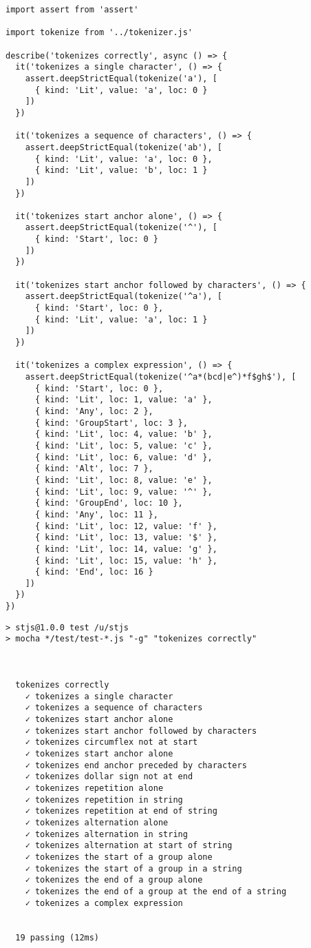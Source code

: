 \documentclass[krantzl]{krantz}
\begin{document}
\begin{lstlisting}[frame=tblr]
import assert from 'assert'

import tokenize from '../tokenizer.js'

describe('tokenizes correctly', async () => {
  it('tokenizes a single character', () => {
    assert.deepStrictEqual(tokenize('a'), [
      { kind: 'Lit', value: 'a', loc: 0 }
    ])
  })

  it('tokenizes a sequence of characters', () => {
    assert.deepStrictEqual(tokenize('ab'), [
      { kind: 'Lit', value: 'a', loc: 0 },
      { kind: 'Lit', value: 'b', loc: 1 }
    ])
  })

  it('tokenizes start anchor alone', () => {
    assert.deepStrictEqual(tokenize('^'), [
      { kind: 'Start', loc: 0 }
    ])
  })

  it('tokenizes start anchor followed by characters', () => {
    assert.deepStrictEqual(tokenize('^a'), [
      { kind: 'Start', loc: 0 },
      { kind: 'Lit', value: 'a', loc: 1 }
    ])
  })

  it('tokenizes a complex expression', () => {
    assert.deepStrictEqual(tokenize('^a*(bcd|e^)*f$gh$'), [
      { kind: 'Start', loc: 0 },
      { kind: 'Lit', loc: 1, value: 'a' },
      { kind: 'Any', loc: 2 },
      { kind: 'GroupStart', loc: 3 },
      { kind: 'Lit', loc: 4, value: 'b' },
      { kind: 'Lit', loc: 5, value: 'c' },
      { kind: 'Lit', loc: 6, value: 'd' },
      { kind: 'Alt', loc: 7 },
      { kind: 'Lit', loc: 8, value: 'e' },
      { kind: 'Lit', loc: 9, value: '^' },
      { kind: 'GroupEnd', loc: 10 },
      { kind: 'Any', loc: 11 },
      { kind: 'Lit', loc: 12, value: 'f' },
      { kind: 'Lit', loc: 13, value: '$' },
      { kind: 'Lit', loc: 14, value: 'g' },
      { kind: 'Lit', loc: 15, value: 'h' },
      { kind: 'End', loc: 16 }
    ])
  })
})
\end{lstlisting}



\begin{lstlisting}[frame=tblr,backgroundcolor=\color{black!5}]
> stjs@1.0.0 test /u/stjs
> mocha */test/test-*.js "-g" "tokenizes correctly"



  tokenizes correctly
    ✓ tokenizes a single character
    ✓ tokenizes a sequence of characters
    ✓ tokenizes start anchor alone
    ✓ tokenizes start anchor followed by characters
    ✓ tokenizes circumflex not at start
    ✓ tokenizes start anchor alone
    ✓ tokenizes end anchor preceded by characters
    ✓ tokenizes dollar sign not at end
    ✓ tokenizes repetition alone
    ✓ tokenizes repetition in string
    ✓ tokenizes repetition at end of string
    ✓ tokenizes alternation alone
    ✓ tokenizes alternation in string
    ✓ tokenizes alternation at start of string
    ✓ tokenizes the start of a group alone
    ✓ tokenizes the start of a group in a string
    ✓ tokenizes the end of a group alone
    ✓ tokenizes the end of a group at the end of a string
    ✓ tokenizes a complex expression


  19 passing (12ms)
\end{lstlisting}
\end{document}
